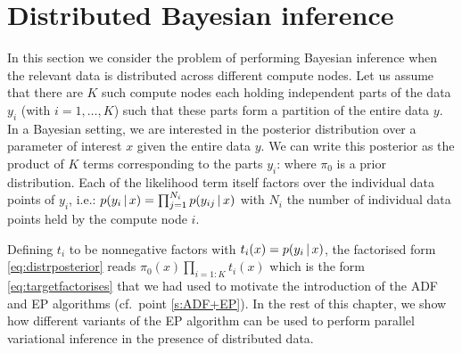 

\section{Distributed Bayesian inference}

In this section we consider the problem of performing Bayesian inference when the relevant data is distributed across different compute nodes. 
Let us assume that there are $K$ such compute nodes each holding independent parts of the data $y_i$ (with $i=1,\dots,K$) such that these parts form a partition of the entire data $y$. 
In a Bayesian setting, we are interested in the posterior distribution over a parameter of interest $x$ given the entire data $y$. We can write this posterior as the product of $K$ terms corresponding to the parts $y_i$:
%
%
where $\pi_0$ is a prior distribution. Each of the likelihood term itself factors over the individual data points of $y_i$, i.e.: $p(y_i\,|\, x)=\prod_{j=1}^{N_i}p(y_{ij}\,|\, x)$ with $N_i$ the number of individual data points held by the compute node $i$.


Defining $t_i$ to be nonnegative factors with $t_i(x)=p(y_i\,|\, x)$, the factorised form \eqref{eq:distrposterior} reads $\pi_0(x)\prod_{i=1:K}t_i(x)$ which is the form \eqref{eq:targetfactorises} that we had used to motivate the introduction of the ADF and EP algorithms (cf.\ point \ref{s:ADF+EP}).
In the rest of this chapter, we show how different variants of the EP algorithm can be used to perform parallel variational inference in the presence of distributed data. 


